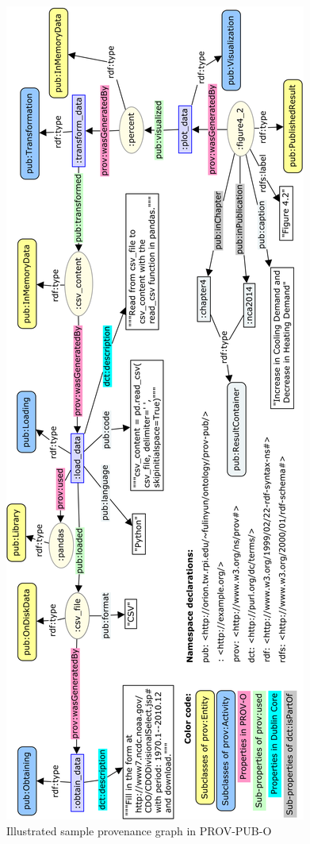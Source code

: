 \begin{figure}
	\centering
	\includegraphics[height=\textheight]{model/ontology/prov-pub/prov-pub-example-bigger.png}
	\caption{Illustrated sample provenance graph in PROV-PUB-O}
	\label{fig:prov-pub-example}
\end{figure}

